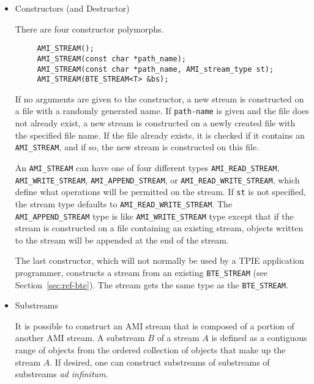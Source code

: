 \begin{itemize}
\item{Constructors (and Destructor)}

There are four constructor polymorphs.

\begin{verbatim}
     AMI_STREAM();
     AMI_STREAM(const char *path_name);
     AMI_STREAM(const char *path_name, AMI_stream_type st);
     AMI_STREAM(BTE_STREAM<T> &bs);
\end{verbatim}


If no arguments are given to the constructor, a new stream 
is constructed on a file with a randomly generated name. If
\verb|path-name| is given and the file does not already
exist, a new stream is constructed on a newly created file
with the specified file name. If the file already exists, it
is checked if it contains an \verb|AMI_STREAM|, and if so,
the new stream is constructed on this file. 

An \verb|AMI_STREAM| can have one of four different types
\verb|AMI_READ_STREAM|, \verb|AMI_WRITE_STREAM|,
\verb|AMI_APPEND_STREAM|, or \verb|AMI_READ_WRITE_STREAM|,
which define what operations will be permitted on the
stream. If \verb|st| is not
specified, the stream type defaults to
\verb|AMI_READ_WRITE_STREAM|. The \verb|AMI_APPEND_STREAM|
type is like \verb|AMI_WRITE_STREAM| type except that if the stream is constructed on a
file containing an existing stream, objects written to the
stream will be appended at the end of the stream.

The last constructor, which will not normally be used by a
TPIE application programmer, constructs a stream from an existing
\verb|BTE_STREAM| (see Section~\ref{sec:ref-bte}). The
stream gets the same type as the \verb|BTE_STREAM|.

\item{Substreams}

It is possible to construct an AMI stream that is composed
of a portion of another AMI stream. A substream $B$ of a
stream $A$ is defined as a contiguous range of objects from
the ordered collection of objects that make up the stream
$A$.  If desired, one can construct substreams of substreams
of substreams {\em ad infinitum}.


\end{itemize}
